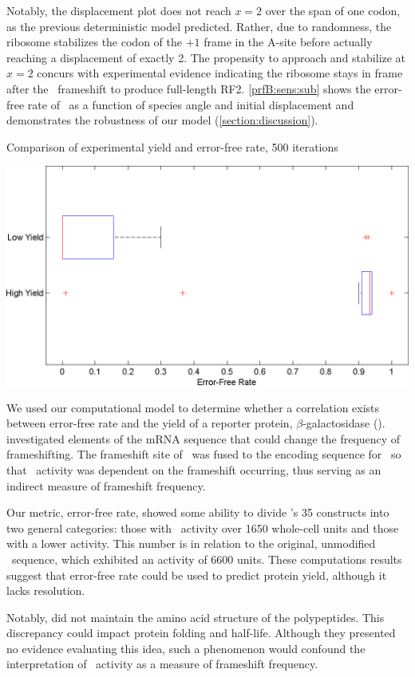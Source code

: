 \documentclass{article}
\begin{document}
Notably, the displacement plot does not reach $x=2$ over the span of
one codon, as the previous deterministic model predicted.  Rather, due to randomness, the
ribosome stabilizes the codon of the $+1$ frame in the A-site before actually reaching
a displacement of exactly 2.  The propensity to approach and stabilize at $x=2$
concurs with experimental evidence indicating the ribosome
stays in frame after the \prfB\ frameshift to produce full-length RF2.
\autoref{prfB:sens:sub} shows the error-free rate of \prfB\ as a function
of species angle and initial displacement and demonstrates the
robustness of our model (\autoref{section:discussion}).

\begin{cfigure}
  \caption{Comparison of experimental yield and error-free rate, 500 iterations}
  \label{weissboxplot}
  \includegraphics[width=0.5\linewidth]{histograms/weissbox}
\end{cfigure}

We used our computational model to determine whether a correlation exists between 
error-free rate and the yield of a reporter protein, $\beta$-galactosidase (\bgals).  
\citet{weiss87} investigated elements of the mRNA sequence that could change the frequency 
of frameshifting.  The frameshift site of \prfB\ was fused to the encoding sequence for 
\bgals\ so that \bgals\ activity was dependent on the frameshift occurring, 
thus serving as an indirect measure of frameshift frequency.  

Our metric, error-free rate, showed some ability to divide \citeauthor{weiss87}'s 35 constructs into 
two general categories: those with \bgals\ activity over 1650 whole-cell units and those with a 
lower activity.  This number is in relation to the original, unmodified \prfB\ sequence, 
which exhibited an activity of 6600 units.  These computations results suggest that 
error-free rate could be used to predict protein yield, although it lacks resolution.

Notably, \citeauthor{weiss87} did not maintain the amino acid structure of the polypeptides.  
This discrepancy could impact protein folding and half-life.  Although they
presented no evidence evaluating this idea, such a phenomenon would confound the interpretation 
of \bgals\ activity as a measure of frameshift frequency.
\end{document}
